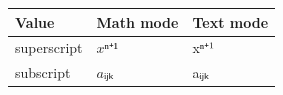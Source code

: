 \documentclass{unittest}
\begin{document}
\begin{tabular}{lll}
	Value & Math mode & Text mode
\\	\midrule
	superscript & $xⁿ⁺¹$ & xⁿ⁺¹
\\	subscript & $aᵢⱼₖ$ & aᵢⱼₖ
\end{tabular}
\end{document}
